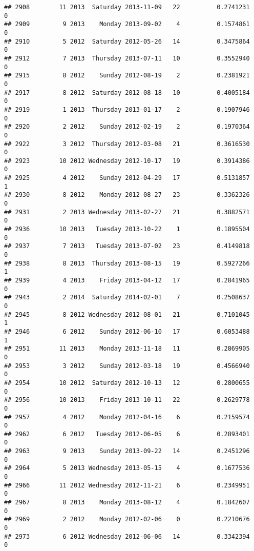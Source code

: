 \documentclass[
]{article}
\begin{document}
\begin{verbatim}
## 2908        11 2013  Saturday 2013-11-09   22          0.2741231             0
## 2909         9 2013    Monday 2013-09-02    4          0.1574861             0
## 2910         5 2012  Saturday 2012-05-26   14          0.3475864             0
## 2912         7 2013  Thursday 2013-07-11   10          0.3552940             0
## 2915         8 2012    Sunday 2012-08-19    2          0.2381921             0
## 2917         8 2012  Saturday 2012-08-18   10          0.4005184             0
## 2919         1 2013  Thursday 2013-01-17    2          0.1907946             0
## 2920         2 2012    Sunday 2012-02-19    2          0.1970364             0
## 2922         3 2012  Thursday 2012-03-08   21          0.3616530             0
## 2923        10 2012 Wednesday 2012-10-17   19          0.3914386             0
## 2925         4 2012    Sunday 2012-04-29   17          0.5131857             1
## 2930         8 2012    Monday 2012-08-27   23          0.3362326             0
## 2931         2 2013 Wednesday 2013-02-27   21          0.3882571             0
## 2936        10 2013   Tuesday 2013-10-22    1          0.1895504             0
## 2937         7 2013   Tuesday 2013-07-02   23          0.4149818             0
## 2938         8 2013  Thursday 2013-08-15   19          0.5927266             1
## 2939         4 2013    Friday 2013-04-12   17          0.2841965             0
## 2943         2 2014  Saturday 2014-02-01    7          0.2508637             0
## 2945         8 2012 Wednesday 2012-08-01   21          0.7101045             1
## 2946         6 2012    Sunday 2012-06-10   17          0.6053488             1
## 2951        11 2013    Monday 2013-11-18   11          0.2869905             0
## 2953         3 2012    Sunday 2012-03-18   19          0.4566940             0
## 2954        10 2012  Saturday 2012-10-13   12          0.2800655             0
## 2956        10 2013    Friday 2013-10-11   22          0.2629778             0
## 2957         4 2012    Monday 2012-04-16    6          0.2159574             0
## 2962         6 2012   Tuesday 2012-06-05    6          0.2893401             0
## 2963         9 2013    Sunday 2013-09-22   14          0.2451296             0
## 2964         5 2013 Wednesday 2013-05-15    4          0.1677536             0
## 2966        11 2012 Wednesday 2012-11-21    6          0.2349951             0
## 2967         8 2013    Monday 2013-08-12    4          0.1842607             0
## 2969         2 2012    Monday 2012-02-06    0          0.2210676             0
## 2973         6 2012 Wednesday 2012-06-06   14          0.3342394             0

\end{verbatim}
\end{document}
